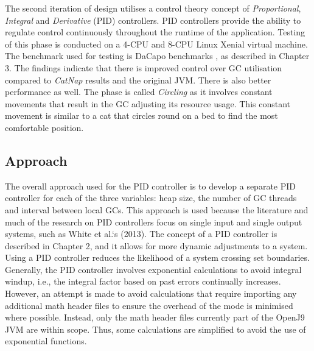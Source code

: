 The second iteration of design utilises a control theory concept of
\emph{Proportional}, \emph{Integral} and \emph{Derivative} (PID) controllers. PID controllers
provide the ability to regulate control continuously throughout the
runtime of the application. Testing of this phase is conducted on a 4-CPU and 8-CPU Linux Xenial virtual machine. The benchmark used for testing
is DaCapo benchmarks \cite{blackburn2006dacapo}, as described in
Chapter 3. 
\newline\newline
The findings indicate that there is improved control over GC
utilisation compared to \emph{CatNap} results and the original JVM. There is
also better performance as well.
\newline\newline
The phase is called \emph{Circling} as it involves constant movements that
result in the GC adjusting its resource usage. This constant movement is
similar to a cat that circles round on a bed to find the
 most comfortable position.
\subsection{Approach}
The overall approach used for the PID controller is to develop a
separate PID controller for each of the three variables: heap size, the
number of GC threads and interval between local GCs. This approach is
used because the literature and much of the research on PID controllers
focus on single input and single output systems, such as White et al.`s
(2013). The concept of a PID controller is described in Chapter 2, and it allows for
more dynamic adjustments to a system. Using a PID controller reduces the
likelihood of a system crossing set boundaries. Generally, the PID
controller involves exponential calculations to avoid integral windup,
i.e., the integral factor based on past errors continually increases.
However, an attempt is made to avoid calculations that require importing
any additional math header files to ensure the overhead of the mode is minimised where possible. Instead, only the math header files
currently part of the OpenJ9 JVM are within scope. Thus, some
calculations are simplified to avoid the use of exponential functions.

